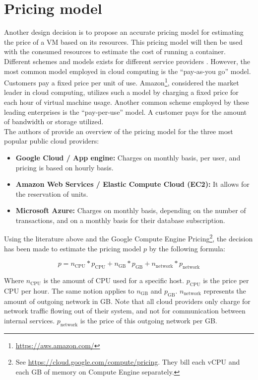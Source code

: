 \section{Pricing model} \label{sec:pricing}

Another design decision is to propose an accurate pricing model for estimating the price of a VM based on its resources.
This pricing model will then be used with the consumed resources to estimate the cost of running a container.
Different schemes and models exists for different service providers \cite{bulla2014cloud}. However, the most common model employed in cloud computing is the ``pay-as-you go'' model. Customers pay a fixed price per unit of use. Amazon\footnote{\url{https://aws.amazon.com/}}, considered the market leader in cloud computing, utilizes such a model by charging a fixed price for each hour of virtual machine usage. 
Another common scheme employed by these leading enterprises is the ``pay-per-use'' model. A customer pays for the amount of bandwidth or storage utilized.\\

\noindent
The authors of \cite{mazrekaj2016pricing} provide an overview of the pricing model for the three most popular public cloud providers:
\begin{itemize}
    \item \textbf{Google Cloud / App engine: }Charges on monthly basis, per user, and pricing is based on hourly basis.
    \item \textbf{Amazon Web Services / Elastic Compute Cloud (EC2): }It allows for the reservation of units.
    \item \textbf{Microsoft Azure: }Charges on monthly basis, depending on the number of transactions, and on a monthly basis for their database subscription.
\end{itemize}

Using the literature above and the Google Compute Engine Pricing\footnote{See \url{https://cloud.google.com/compute/pricing}. They bill each vCPU and each GB of memory on Compute Engine separately.}, the decision has been made to estimate the pricing model $p$ by the following formula:

\begin{equation} \label{eq:p}
p =  n_\text{CPU} * p_\text{CPU} + n_\text{GB} * p_\text{GB} + n_\text{network} * p_\text{network}
\end{equation}

\noindent
Where $n_\text{CPU}$ is the amount of CPU used for a specific host. $p_\text{CPU}$ is the price per CPU per hour. The same notion applies to $n_\text{GB}$ and $p_\text{GB}$. $n_\text{network}$ represents the amount of outgoing network in GB. Note that all cloud providers only charge for network traffic flowing out of their system, and not for communication between internal services. $p_\text{network}$ is the price of this outgoing network per GB.\\

